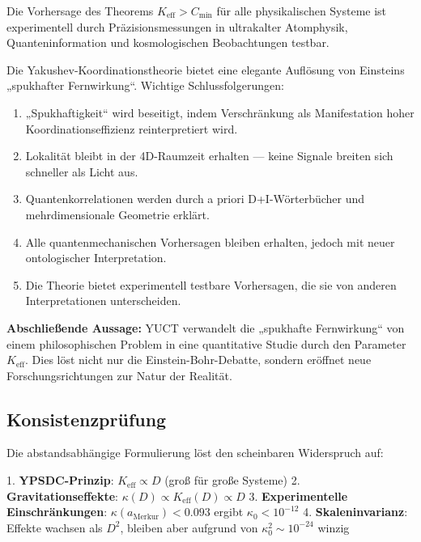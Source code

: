 \documentclass[11pt,a4paper]{article}
\begin{document}
	Die Vorhersage des Theorems $K_{\mathrm{eff}} > C_{\min}$ für alle physikalischen Systeme ist experimentell durch Präzisionsmessungen in ultrakalter Atomphysik, Quanteninformation und kosmologischen Beobachtungen testbar.
	
	Die Yakushev-Koordinationstheorie bietet eine elegante Auflösung von Einsteins „spukhafter Fernwirkung“. Wichtige Schlussfolgerungen:
	
	\begin{enumerate}
		\item „Spukhaftigkeit“ wird beseitigt, indem Verschränkung als Manifestation hoher Koordinationseffizienz reinterpretiert wird.
		
		\item Lokalität bleibt in der 4D-Raumzeit erhalten — keine Signale breiten sich schneller als Licht aus.
		
		\item Quantenkorrelationen werden durch a priori D+I-Wörterbücher und mehrdimensionale Geometrie erklärt.
		
		\item Alle quantenmechanischen Vorhersagen bleiben erhalten, jedoch mit neuer ontologischer Interpretation.
		
		\item Die Theorie bietet experimentell testbare Vorhersagen, die sie von anderen Interpretationen unterscheiden.
	\end{enumerate}
	
	\textbf{Abschließende Aussage:} YUCT verwandelt die „spukhafte Fernwirkung“ von einem philosophischen Problem in eine quantitative Studie durch den Parameter $K_{\mathrm{eff}}$. Dies löst nicht nur die Einstein-Bohr-Debatte, sondern eröffnet neue Forschungsrichtungen zur Natur der Realität.
	\subsection{Konsistenzprüfung}
	
	Die abstandsabhängige Formulierung löst den scheinbaren Widerspruch auf:
	
	1. \textbf{YPSDC-Prinzip}: $K_{\mathrm{eff}} \propto D$ (groß für große Systeme)
	2. \textbf{Gravitationseffekte}: $\kappa(D) \propto K_{\mathrm{eff}}(D) \propto D$
	3. \textbf{Experimentelle Einschränkungen}: $\kappa(a_{\text{Merkur}}) < 0.093$ ergibt $\kappa_0 < 10^{-12}$
	4. \textbf{Skaleninvarianz}: Effekte wachsen als $D^2$, bleiben aber aufgrund von $\kappa_0^2 \sim 10^{-24}$ winzig
	
\end{document}
